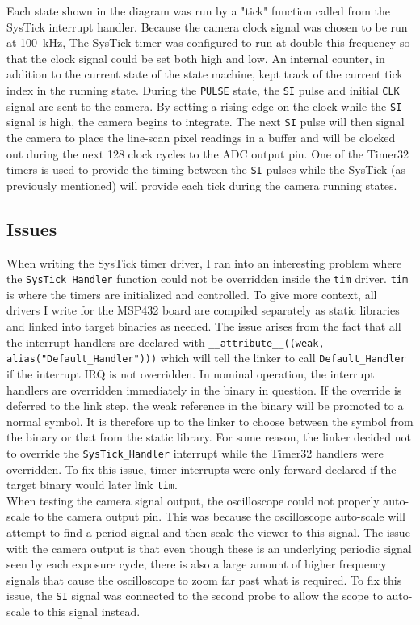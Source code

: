 \documentclass[CMPE]{../KGCOEReport}
\def\code#1{\texttt{#1}}
\begin{document}
	Each state shown in the diagram was run by a "tick" function called from the
	SysTick interrupt handler. Because the camera clock signal was chosen to be run
	at \SI{100}{\kilo\Hz}, The SysTick timer was configured to run at double this
	frequency so that the clock signal could be set both high and low. An internal
	counter, in addition to the current state of the state machine, kept track of
	the current tick index in the running state. During the \code{PULSE} state,
	the \code{SI} pulse and initial \code{CLK} signal are sent to the camera. By
	setting a rising edge on the clock while the \code{SI} signal is high, the camera
	begins to integrate. The next \code{SI} pulse will then signal the camera to place
	the line-scan pixel readings in a buffer and will be clocked out during the next
	128 clock cycles to the ADC output pin. One of the Timer32 timers is used to provide
	the timing between the \code{SI} pulses while the SysTick (as previously mentioned)
	will provide each tick during the camera running states.

	\subsection*{Issues}

	When writing the SysTick timer driver, I ran into an interesting problem where the
	\code{SysTick\_Handler} function could not be overridden inside the \code{tim}
	driver. \code{tim} is where the timers are initialized and controlled.
	To give more context, all drivers I write for the MSP432 board are compiled
	separately as static libraries and linked into target binaries as needed.
	The issue arises from the fact
	that all the interrupt handlers are declared with \code{\_\_attribute\_\_((weak, alias("Default\_Handler")))} which will tell the linker to call \code{Default\_Handler}
	if the interrupt IRQ is not overridden. In nominal operation, the interrupt handlers
	are overridden immediately in the binary in question. If the override is deferred to
	the link step, the weak reference in the binary will be promoted to a normal symbol.
	It is therefore up to the linker to choose between the symbol from the binary or that
	from the static library. For some reason,
	the linker decided not to override the \code{SysTick\_Handler} interrupt while the
	Timer32 handlers were overridden. To fix this issue, timer interrupts were only forward
	declared if the target binary would later link \code{tim}.\\

	When testing the camera signal output, the oscilloscope could not properly auto-scale
	to the camera output pin. This was because the oscilloscope auto-scale will attempt
	to find a period signal and then scale the viewer to this signal. The issue with
	the camera output is that even though these is an underlying periodic signal
	seen by each exposure cycle, there is also a large amount of higher frequency
 	signals that cause the oscilloscope to zoom far past what is required. To fix this
 	issue, the \code{SI} signal was connected to the second probe to allow the scope to
 	auto-scale to this signal instead.
\end{document}
